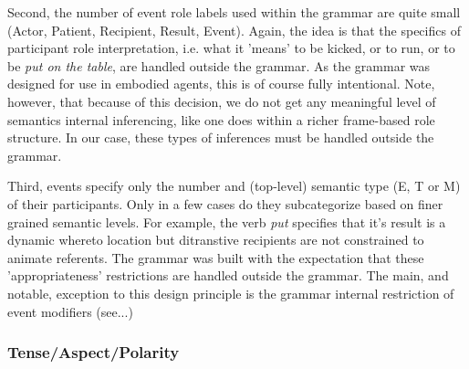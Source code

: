Second, the number of event role labels used within the grammar are quite small (Actor, Patient, Recipient, Result, Event). Again, the idea is that the specifics of participant role interpretation, i.e. what it 'means' to be kicked, or to run, or to be \emph{put on the table}, are handled outside the grammar. As the grammar was designed for use in embodied agents, this is of course fully intentional. Note, however, that because of this decision, we do not get any meaningful level of semantics internal inferencing, like one does within a richer frame-based role structure. In our case, these  types of inferences must be handled outside the grammar.

Third, events specify only the number and (top-level) semantic type (E, T or M) of their participants. Only in a few cases do they subcategorize based on finer grained semantic levels. For example, the verb \emph{put} specifies that it's result is a dynamic whereto location but ditranstive recipients are not constrained to animate referents. The  grammar was built with the expectation that these 'appropriateness' restrictions are handled outside the grammar. The main, and notable, exception to this design principle is the grammar internal restriction of event modifiers (see...)

\subsubsection{Tense/Aspect/Polarity} \label{sec-TAM}

